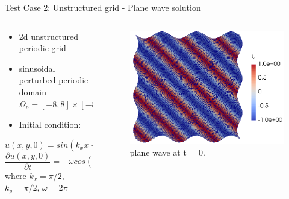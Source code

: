 \documentclass[10pt, aspectratio=169]{beamer}
\begin{document}
\begin{frame}{Test Case 2: Unstructured grid - Plane wave solution}
																	
	\begin{columns}
		\begin{column}{0.45\textwidth}
			\begin{itemize}
				\item 2d unstructured periodic grid
				\item sinusoidal perturbed periodic domain $\Omega_p = [-8,8]\times[-8,8]$
				\item Initial condition:
			\end{itemize}
			$$u(x,y,0) = sin(k_{x}x + k_{y}y)$$
			$$\frac{\partial u(x,y,0)}{\partial t} = -\omega cos(k_{x}x + k_{y}y)$$
			where $k_{x} = {\pi}/{2}$, $k_{y} = {\pi}/{2}$, $\omega = 2\pi$
		\end{column}
																																			
		\begin{column}{0.45\textwidth}
			\begin{figure}
				\centering
				\includegraphics[scale=0.23]{plane_wave_grid.png}
				\caption{plane wave at t = 0.}
			\end{figure}
		\end{column}
	\end{columns}
\end{frame}
\end{document}
